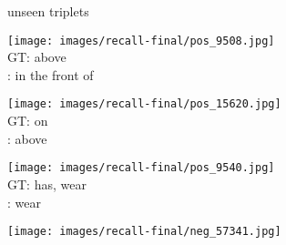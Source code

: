 \documentclass[10pt,twocolumn,letterpaper]{article}
\begin{document}
\begin{figure*}[t]
\begin{minipage}[b]{0.005\textwidth}
    	\centering
    	\begin{turn}{90}
    	unseen triplets
    	\end{turn}
    	\vspace{1.5ex}
   	\end{minipage}
    \hspace{0.01\textwidth}
\begin{minipage}[b]{0.18\textwidth}
    	\centering
       	\texttt{[image: images/recall-final/pos\_9508.jpg]}\\
       	\vspace{0.2ex}
       	\small{
       	GT: above\\
       	\cite{Lu16}: in the front of
       	}
       	\vspace{0.3ex}
    \end{minipage}
    \hspace{0.005\textwidth}
\begin{minipage}[b]{0.18\textwidth}
    	\centering
       	\texttt{[image: images/recall-final/pos\_15620.jpg]}\\
       	\vspace{0.2ex}
       	\small{
       	GT: on\\
       	\cite{Lu16}: above
       	}
       	\vspace{0.3ex}
    \end{minipage}  
    \hspace{0.005\textwidth}
\begin{minipage}[b]{0.18\textwidth}
    	\centering
       	\texttt{[image: images/recall-final/pos\_9540.jpg]}\\
       	\vspace{0.2ex}
       	\small{
       	GT: has, wear\\
       	\cite{Lu16}: wear
       	}
       	\vspace{0.3ex}
    \end{minipage} 
    \hspace{0.005\textwidth}
\begin{minipage}[b]{0.18\textwidth}
       	\centering
    	\texttt{[image: images/recall-final/neg\_57341.jpg]}\\

\end{minipage}
\end{figure*}
\end{document}
